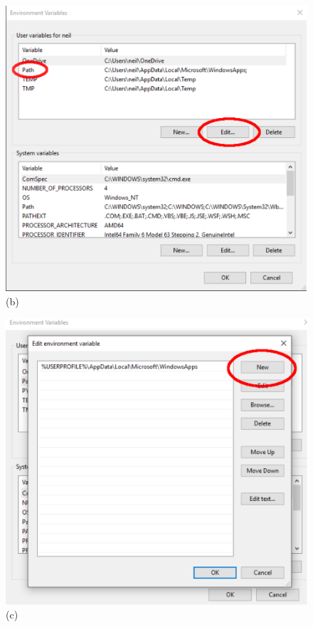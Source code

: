 \begin{figure}
\begin{center}
\begin{minipage}[t]{.29\textwidth}
\begin{center}
\includegraphics[width=\textwidth]{Figures/win/Win2.pdf}
(b)
\end{center}
\end{minipage}
\begin{minipage}[t]{.29\textwidth}
\begin{center}
\includegraphics[width=\textwidth]{Figures/win/Win3.pdf}
(c)
\end{center}
\end{minipage}


\end{center}
\end{figure}
